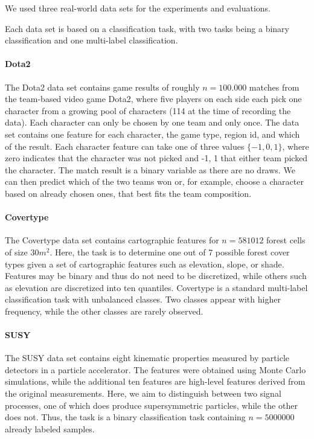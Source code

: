 We used three real-world data sets for the experiments and evaluations. 

Each data set is based on a classification task, with two tasks being a binary classification and one multi-label classification.

\paragraph*{Dota2}
The Dota2 data set contains game results of roughly $n=100.000$ matches from the team-based video game Dota2, where five players on each side each pick one character from a growing pool of characters (114 at the time of recording the data).
Each character can only be chosen by one team and only once.
The data set contains one feature for each character, the game type, region id, and which of the result.
Each character feature can take one of three values $\{-1,0,1\}$, where zero indicates that the character was not picked and -1, 1 that either team picked the character.
The match result is a binary variable as there are no draws.
We can then predict which of the two teams won or, for example, choose a character based on already chosen ones, that best fits the team composition.

\paragraph*{Covertype}
The Covertype data set contains cartographic features for  $n=581012$ forest cells of size $30m^2$.
Here, the task is to determine one out of 7 possible forest cover types given a set of cartographic features such as elevation, slope, or shade. 
Features may be binary and thus do not need to be discretized, while others such as elevation are discretized into ten quantiles.
Covertype is a standard multi-label classification task with unbalanced classes.
Two classes appear with higher frequency, while the other classes are rarely observed.

\paragraph*{SUSY}
The SUSY data set contains eight kinematic properties measured by particle detectors in a particle accelerator. 
The features were obtained using Monte Carlo simulations, while the additional ten features are high-level features derived from the original measurements.
Here, we aim to distinguish between two signal processes, one of which does produce supersymmetric particles, while the other does not. 
Thus, the task is a binary classification task containing $n=5000000$ already labeled samples.

